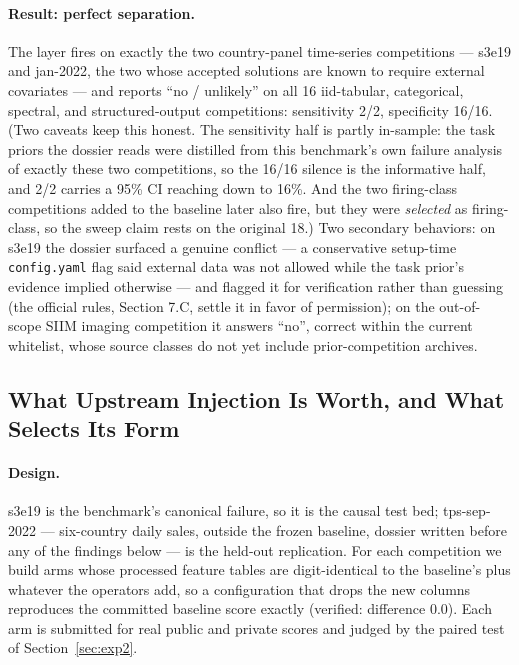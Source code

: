 \documentclass[11pt,a4paper]{article}
\begin{document}
\paragraph{Result: perfect separation.} The layer fires on exactly the two country-panel time-series competitions --- s3e19 and jan-2022, the two whose accepted solutions are known to require external covariates --- and reports ``no / unlikely'' on all 16 iid-tabular, categorical, spectral, and structured-output competitions: sensitivity 2/2, specificity 16/16. (Two caveats keep this honest. The sensitivity half is partly in-sample: the task priors the dossier reads were distilled from this benchmark's own failure analysis of exactly these two competitions, so the 16/16 silence is the informative half, and 2/2 carries a 95\% CI reaching down to 16\%. And the two firing-class competitions added to the baseline later also fire, but they were \emph{selected} as firing-class, so the sweep claim rests on the original 18.) Two secondary behaviors: on s3e19 the dossier surfaced a genuine conflict --- a conservative setup-time \texttt{config.yaml} flag said external data was not allowed while the task prior's evidence implied otherwise --- and flagged it for verification rather than guessing (the official rules, Section 7.C, settle it in favor of permission); on the out-of-scope SIIM imaging competition it answers ``no'', correct within the current whitelist, whose source classes do not yet include prior-competition archives.

\subsection{What Upstream Injection Is Worth, and What Selects Its Form}
\label{sec:exp6v5}

\paragraph{Design.} s3e19 is the benchmark's canonical failure, so it is the causal test bed; tps-sep-2022 --- six-country daily sales, outside the frozen baseline, dossier written before any of the findings below --- is the held-out replication. For each competition we build arms whose processed feature tables are digit-identical to the baseline's plus whatever the operators add, so a configuration that drops the new columns reproduces the committed baseline score exactly (verified: difference 0.0). Each arm is submitted for real public and private scores and judged by the paired test of Section~\ref{sec:exp2}.
\end{document}
